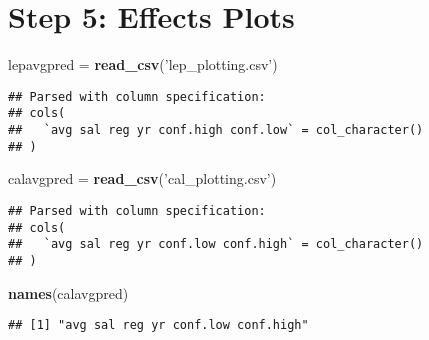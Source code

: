 \documentclass[]{article}
\newenvironment{Shaded}{\begin{snugshade}}{\end{snugshade}}
\newcommand{\KeywordTok}[1]{\textcolor[rgb]{0.13,0.29,0.53}{\textbf{#1}}}
\newcommand{\StringTok}[1]{\textcolor[rgb]{0.31,0.60,0.02}{#1}}
\newcommand{\NormalTok}[1]{#1}
\begin{document}
\section{Step 5: Effects Plots}\label{step-5-effects-plots}

\begin{Shaded}
\begin{Highlighting}[]
\NormalTok{lepavgpred =}\StringTok{ }\KeywordTok{read_csv}\NormalTok{(}\StringTok{'lep_plotting.csv'}\NormalTok{)}
\end{Highlighting}
\end{Shaded}

\begin{verbatim}
## Parsed with column specification:
## cols(
##   `avg sal reg yr conf.high conf.low` = col_character()
## )
\end{verbatim}

\begin{Shaded}
\begin{Highlighting}[]
\NormalTok{calavgpred =}\StringTok{ }\KeywordTok{read_csv}\NormalTok{(}\StringTok{'cal_plotting.csv'}\NormalTok{)}
\end{Highlighting}
\end{Shaded}

\begin{verbatim}
## Parsed with column specification:
## cols(
##   `avg sal reg yr conf.low conf.high` = col_character()
## )
\end{verbatim}

\begin{Shaded}
\begin{Highlighting}[]
\KeywordTok{names}\NormalTok{(calavgpred)}
\end{Highlighting}
\end{Shaded}

\begin{verbatim}
## [1] "avg sal reg yr conf.low conf.high"
\end{verbatim}
\end{document}
